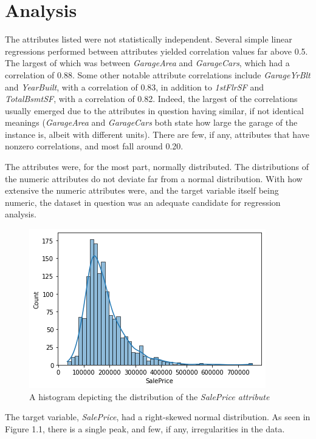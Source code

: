\documentclass[12pt]{article}
\begin{document}
\section*{Analysis}
\par \qquad The attributes listed were not statistically independent. Several simple linear regressions performed between attributes yielded correlation values far above 0.5. The largest of which was between \emph{GarageArea} and \emph{GarageCars}, which had a correlation of 0.88. Some other notable attribute correlations include \emph{GarageYrBlt} and \emph{YearBuilt}, with a correlation of 0.83, in addition to \emph{1stFlrSF} and \emph{TotalBsmtSF}, with a correlation of 0.82. Indeed, the largest of the correlations usually emerged due to the attributes in question having similar, if not identical meanings (\emph{GarageArea} and \emph{GarageCars} both state how large the garage of the instance is, albeit with different units). There are few, if any, attributes that have nonzero correlations, and most fall around 0.20.
\par The attributes were, for the most part, normally distributed. The distributions of the numeric attributes do not deviate far from a normal distribution. With how extensive the numeric attributes were, and the target variable itself being numeric, the dataset in question was an adequate candidate for regression analysis.

\begin{figure}[H]
\centering
\renewcommand{\thefigure}{1.1}
\includegraphics{fig1.3.png}
\caption{A histogram depicting the distribution of the \emph{SalePrice attribute}}
\end{figure}

\par The target variable, \emph{SalePrice}, had a right-skewed normal distribution. As seen in Figure 1.1, there is a single peak, and few, if any, irregularities in the data.
\end{document}
